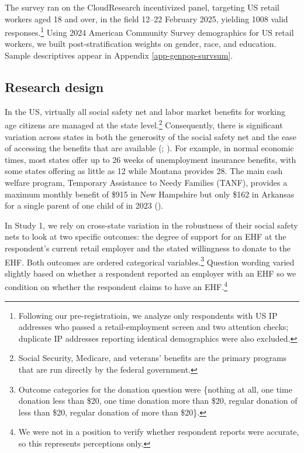 \documentclass[
  11pt,
  oneside]{article}
\begin{document}
The survey ran on the CloudResearch incentivized panel, targeting US retail workers aged 18 and over, in the field 12--22 February 2025, yielding 1008 valid responses.\footnote{Following our pre-registratioin, we analyze only respondents with US IP addresses who passed a retail-employment screen and two attention checks; duplicate IP addresses reporting identical demographics were also excluded.} Using 2024 American Community Survey demographics for US retail workers, we built post-stratification weights on gender, race, and education. Sample descriptives appear in Appendix \ref{app-genpop-survsum}.

\subsection{Research design}\label{research-design}

In the US, virtually all social safety net and labor market benefits for working age citizens are managed at the state level.\footnote{Social Security, Medicare, and veterans' benefits are the primary programs that are run directly by the federal government.} Consequently, there is significant variation across states in both the generosity of the social safety net and the ease of accessing the benefits that are available (; ). For example, in normal economic times, most states offer up to 26 weeks of unemployment insurance benefits, with some states offering as little as 12 while Montana provides 28. The main cash welfare program, Temporary Assistance to Needy Families (TANF), provides a maximum monthly benefit of \$915 in New Hampshire but only \$162 in Arkansas for a single parent of one child of in 2023 ().

In Study 1, we rely on cross-state variation in the robustness of their social safety nets to look at two specific outcomes: the degree of support for an EHF at the respondent's current retail employer and the stated willingness to donate to the EHF. Both outcomes are ordered categorical variables.\footnote{Outcome categories for the donation question were \{nothing at all, one time donation less than \$20, one time donation more than \$20, regular donation of less than \$20, regular donation of more than \$20\}.} Question wording varied slightly based on whether a respondent reported an employer with an EHF so we condition on whether the respondent claims to have an EHF.\footnote{We were not in a position to verify whether respondent reports were accurate, so this represents perceptions only.}
\end{document}
